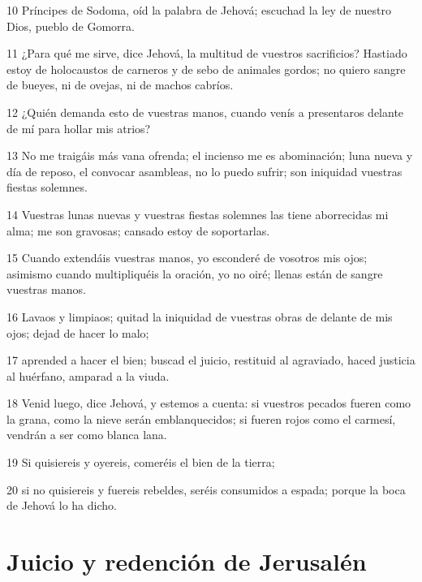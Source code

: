 \par 10 Príncipes de Sodoma, oíd la palabra de Jehová; escuchad la ley de nuestro Dios, pueblo de Gomorra.
\par 11 ¿Para qué me sirve, dice Jehová, la multitud de vuestros sacrificios? Hastiado estoy de holocaustos de carneros y de sebo de animales gordos; no quiero sangre de bueyes, ni de ovejas, ni de machos cabríos.
\par 12 ¿Quién demanda esto de vuestras manos, cuando venís a presentaros delante de mí para hollar mis atrios?
\par 13 No me traigáis más vana ofrenda; el incienso me es abominación; luna nueva y día de reposo, el convocar asambleas, no lo puedo sufrir; son iniquidad vuestras fiestas solemnes.
\par 14 Vuestras lunas nuevas y vuestras fiestas solemnes las tiene aborrecidas mi alma; me son gravosas; cansado estoy de soportarlas.
\par 15 Cuando extendáis vuestras manos, yo esconderé de vosotros mis ojos; asimismo cuando multipliquéis la oración, yo no oiré; llenas están de sangre vuestras manos.
\par 16 Lavaos y limpiaos; quitad la iniquidad de vuestras obras de delante de mis ojos; dejad de hacer lo malo;
\par 17 aprended a hacer el bien; buscad el juicio, restituid al agraviado, haced justicia al huérfano, amparad a la viuda.
\par 18 Venid luego, dice Jehová, y estemos a cuenta: si vuestros pecados fueren como la grana, como la nieve serán emblanquecidos; si fueren rojos como el carmesí, vendrán a ser como blanca lana.
\par 19 Si quisiereis y oyereis, comeréis el bien de la tierra;
\par 20 si no quisiereis y fuereis rebeldes, seréis consumidos a espada; porque la boca de Jehová lo ha dicho.

\section*{Juicio y redención de Jerusalén}

